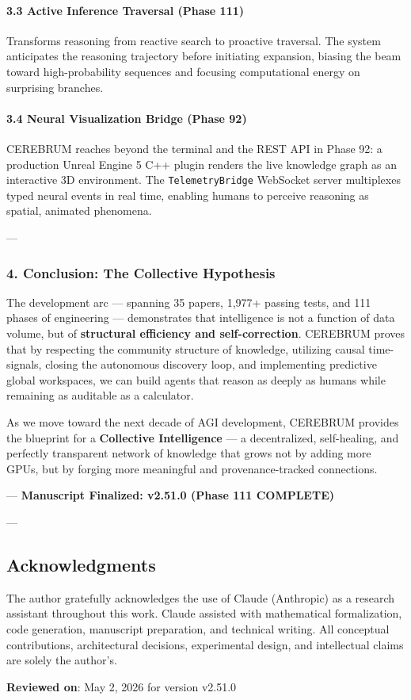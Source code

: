 \paragraph{3.3 Active Inference Traversal (Phase 111)}
Transforms reasoning from reactive search to proactive traversal. The system anticipates the reasoning trajectory before initiating expansion, biasing the beam toward high-probability sequences and focusing compu\-tational energy on surprising branches.

\paragraph{3.4 Neural Visual\-ization Bridge (Phase 92)}
CEREBRUM reaches beyond the terminal and the REST API in Phase 92: a production Unreal Engine 5 C++ plugin renders the live knowledge graph as an interactive 3D environment. The \texttt{TelemetryBridge} WebSocket server multiplexes typed neural events in real time, enabling humans to perceive reasoning as spatial, animated phenomena.

---

\subsubsection{4. Conclusion: The Collective Hypothesis}
The development arc — spanning 35 papers, 1,977+ passing tests, and 111 phases of engineering — demon\-strates that intel\-ligence is not a function of data volume, but of \textbf{structural efficiency and self-correction}. CEREBRUM proves that by respecting the community structure of knowledge, utilizing causal time-signals, closing the autonomous discovery loop, and imple\-menting predictive global workspaces, we can build agents that reason as deeply as humans while remaining as auditable as a calculator.

As we move toward the next decade of AGI development, CEREBRUM provides the blueprint for a \textbf{Collective Intell\-igence} — a decen\-tralized, self-healing, and perfectly transparent network of knowledge that grows not by adding more GPUs, but by forging more meaningful and provenance-tracked connections.

---
\textbf{Manuscript Finalized: v2.51.0 (Phase 111 COMPLETE)}

---
\subsection{Acknow\-ledgments}

The author gratefully ackno\-wledges the use of Claude (Anthropic) as a research assistant throughout this work. Claude assisted with mathe\-matical forma\-lization, code generation, manuscript preparation, and technical writing. All conceptual contr\-ibutions, archi\-tectural decisions, exper\-imental design, and intel\-lectual claims are solely the author's.

\textbf{Reviewed on}: May 2, 2026 for version v2.51.0
